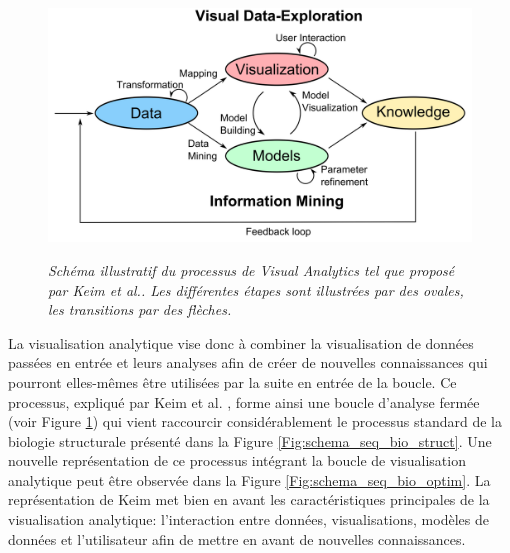 \begin{figure}
  \centering
  {\includegraphics[width=.75\linewidth]{./figures/ch2/visual_analytics_process_keim}}
    \caption{{\it Schéma illustratif du processus de Visual Analytics tel que proposé par Keim \textit{et al.}. Les différentes étapes sont illustrées par des ovales, les transitions par des flèches.}}
  \label{Fig:visual_analytics_process_keim}
  \hspace{0.3cm}
\end{figure}

La visualisation analytique vise donc à combiner la visualisation de données passées en entrée et leurs analyses afin de créer de nouvelles connaissances qui pourront elles-mêmes être utilisées par la suite en entrée de la boucle. Ce processus, expliqué par Keim et al. \cite{keim2010mastering}, forme ainsi une boucle d'analyse fermée (voir Figure \ref{Fig:visual_analytics_process_keim}) qui vient raccourcir considérablement le processus standard de la biologie structurale présenté dans la Figure \ref{Fig:schema_seq_bio_struct}. Une nouvelle représentation de ce processus intégrant la boucle de visualisation analytique peut être observée dans la Figure \ref{Fig:schema_seq_bio_optim}. La représentation de Keim met bien en avant les caractéristiques principales de la visualisation analytique: l'interaction entre données, visualisations, modèles de données et l'utilisateur afin de mettre en avant de nouvelles connaissances. 

